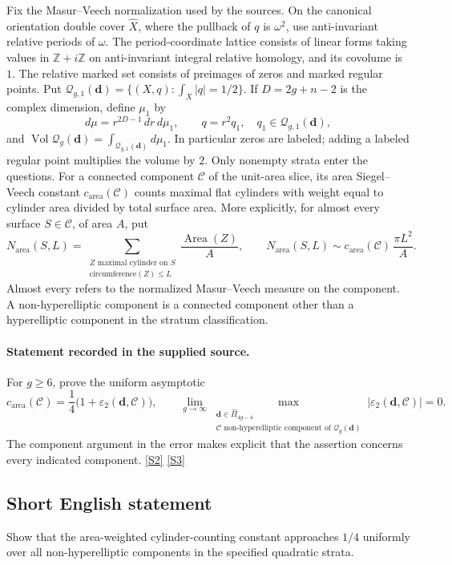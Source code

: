 \documentclass[11pt]{article}
\newcommand{\sref}[2]{\hyperlink{source:#1:#2}{[S#2]}}
\begin{document}
Fix the Masur--Veech normalization used by the sources. On the canonical orientation double cover $\widehat X$, where the pullback of $q$ is $\omega^2$, use anti-invariant relative periods of $\omega$. The period-coordinate lattice consists of linear forms taking values in $\mathbb Z+i\mathbb Z$ on anti-invariant integral relative homology, and its covolume is $1$. The relative marked set consists of preimages of zeros and marked regular points. Put $\mathcal Q_{g,1}(\boldsymbol d)=\{(X,q):\int_X|q|=1/2\}$. If $D=2g+n-2$ is the complex dimension, define $\mu_1$ by
\[
 d\mu=r^{2D-1}\,dr\,d\mu_1,\qquad q=r^2q_1,\quad q_1\in\mathcal Q_{g,1}(\boldsymbol d),
\]
and $\operatorname{Vol}\mathcal Q_g(\boldsymbol d)=\int_{\mathcal Q_{g,1}(\boldsymbol d)}d\mu_1$. In particular zeros are labeled; adding a labeled regular point multiplies the volume by $2$. Only nonempty strata enter the questions.
For a connected component $\mathcal C$ of the unit-area slice, its area Siegel--Veech constant $c_{\mathrm{area}}(\mathcal C)$ counts maximal flat cylinders with weight equal to cylinder area divided by total surface area. More explicitly, for almost every surface $S\in\mathcal C$, of area $A$, put
\[
N_{\mathrm{area}}(S,L)=\sum_{\substack{Z\text{ maximal cylinder on }S\\\text{circumference}(Z)\le L}}
\frac{\operatorname{Area}(Z)}{A},\qquad
N_{\mathrm{area}}(S,L)\sim c_{\mathrm{area}}(\mathcal C)\,\frac{\pi L^2}{A}.
\]
Almost every refers to the normalized Masur--Veech measure on the component. A non-hyperelliptic component is a connected component other than a hyperelliptic component in the stratum classification.
\paragraph{Statement recorded in the supplied source.}
For $g\ge6$, prove the uniform asymptotic
\[
 c_{\mathrm{area}}(\mathcal C)=\frac14\bigl(1+\varepsilon_2(\boldsymbol d,\mathcal C)\bigr),\qquad
 \lim_{g\to\infty}\max_{\substack{\boldsymbol d\in\widehat\Pi_{4g-4}\\\mathcal C\text{ non-hyperelliptic component of }\mathcal Q_g(\boldsymbol d)}}
 |\varepsilon_2(\boldsymbol d,\mathcal C)|=0.
\]
The component argument in the error makes explicit that the assertion concerns every indicated component. \sref{3600002}{2} \sref{3600002}{3}
\subsection{Short English statement}
Show that the area-weighted cylinder-counting constant approaches $1/4$ uniformly over all non-hyperelliptic components in the specified quadratic strata.
\end{document}
